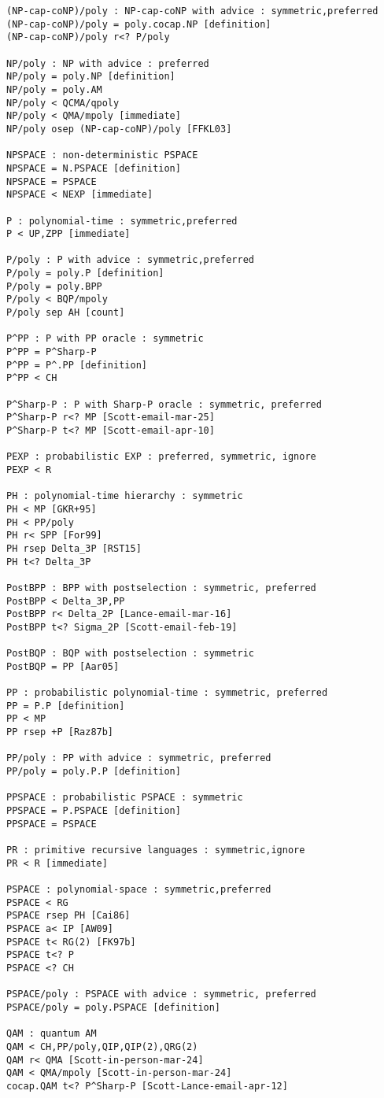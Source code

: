 \begin{verbatim}
(NP-cap-coNP)/poly : NP-cap-coNP with advice : symmetric,preferred
(NP-cap-coNP)/poly = poly.cocap.NP [definition]
(NP-cap-coNP)/poly r<? P/poly

NP/poly : NP with advice : preferred
NP/poly = poly.NP [definition]
NP/poly = poly.AM
NP/poly < QCMA/qpoly
NP/poly < QMA/mpoly [immediate]
NP/poly osep (NP-cap-coNP)/poly [FFKL03]

NPSPACE : non-deterministic PSPACE
NPSPACE = N.PSPACE [definition]
NPSPACE = PSPACE
NPSPACE < NEXP [immediate]

P : polynomial-time : symmetric,preferred
P < UP,ZPP [immediate]

P/poly : P with advice : symmetric,preferred
P/poly = poly.P [definition]
P/poly = poly.BPP
P/poly < BQP/mpoly
P/poly sep AH [count]

P^PP : P with PP oracle : symmetric
P^PP = P^Sharp-P
P^PP = P^.PP [definition]
P^PP < CH

P^Sharp-P : P with Sharp-P oracle : symmetric, preferred
P^Sharp-P r<? MP [Scott-email-mar-25]
P^Sharp-P t<? MP [Scott-email-apr-10]

PEXP : probabilistic EXP : preferred, symmetric, ignore
PEXP < R

PH : polynomial-time hierarchy : symmetric
PH < MP [GKR+95]
PH < PP/poly
PH r< SPP [For99]
PH rsep Delta_3P [RST15]
PH t<? Delta_3P

PostBPP : BPP with postselection : symmetric, preferred
PostBPP < Delta_3P,PP
PostBPP r< Delta_2P [Lance-email-mar-16]
PostBPP t<? Sigma_2P [Scott-email-feb-19]

PostBQP : BQP with postselection : symmetric
PostBQP = PP [Aar05]

PP : probabilistic polynomial-time : symmetric, preferred
PP = P.P [definition]
PP < MP
PP rsep +P [Raz87b]

PP/poly : PP with advice : symmetric, preferred
PP/poly = poly.P.P [definition]

PPSPACE : probabilistic PSPACE : symmetric
PPSPACE = P.PSPACE [definition]
PPSPACE = PSPACE

PR : primitive recursive languages : symmetric,ignore
PR < R [immediate]

PSPACE : polynomial-space : symmetric,preferred
PSPACE < RG
PSPACE rsep PH [Cai86]
PSPACE a< IP [AW09]
PSPACE t< RG(2) [FK97b]
PSPACE t<? P
PSPACE <? CH

PSPACE/poly : PSPACE with advice : symmetric, preferred
PSPACE/poly = poly.PSPACE [definition]

QAM : quantum AM
QAM < CH,PP/poly,QIP,QIP(2),QRG(2)
QAM r< QMA [Scott-in-person-mar-24]
QAM < QMA/mpoly [Scott-in-person-mar-24]
cocap.QAM t<? P^Sharp-P [Scott-Lance-email-apr-12]


\end{verbatim}
